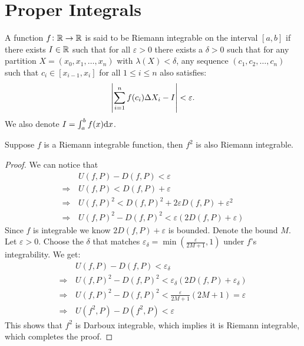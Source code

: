 \documentclass[11pt,a4paper]{article}
\begin{document}
  \maketitle

  \newpage
  \tableofcontents
	\newpage

  \section{Proper Integrals}
  \begin{definition}
    A function $f \colon \mathbb{R} \to \mathbb{R}$ is said to be Riemann integrable on the 
    interval $[a,b]$ if there exists $I \in \mathbb{R}$ such that for all 
    $\varepsilon > 0$ there exists a $\delta > 0$ such that 
    for any partition $X = (x_0,x_1,\dots,x_n)$ with $\lambda(X) < \delta$, 
    any sequence $(c_1,c_2,\ldots,c_n)$ such that $c_i \in[x_{i-1},x_i]$ for
    all $1 \le i \le n$ also satisfies:
    \[
      \left\lvert\sum_{i=1}^{n}{f(c_i)\Delta X_i} - I\right\rvert < \varepsilon.
	  \]
    We also denote $I = \int_{a}^{b} f(x)\dx$.
  \end{definition}
  \begin{proposition}
	  Suppose $f$ is a Riemann integrable function,
    then $f^2$ is also Riemann integrable.
  \end{proposition}
  \begin{proof}
    We can notice that
    \begin{align*}
      &U(f,P) - D(f,P) < \varepsilon \\
      \Rightarrow\, &U(f,P) < D(f,P) + \varepsilon \\
      \Rightarrow\, &U(f,P)^2<D(f,P)^2 + 2\varepsilon D(f,P) + \varepsilon^2 \\
      \Rightarrow\, &U(f,P)^2 - D(f,P)^2 < \varepsilon (2D(f,P) + \varepsilon)
    \end{align*}	
    Since $f$ is integrable we know $2D(f,P) + \varepsilon$ is bounded.
    Denote the bound $M$.
    Let $\varepsilon > 0$.
    Choose the $\delta$ that matches 
    $\varepsilon_{\delta} = \min(\frac{\varepsilon}{2M+1},1)$ 
    under $f$'s integrability.
    We get:
      \begin{align*}
        &U(f,P) - D(f,P) < \varepsilon_{\delta} \\
        \Rightarrow\, &U(f,P)^2 - D(f,P)^2 <
          \varepsilon_{\delta} (2D(f,P) + \varepsilon_{\delta}) \\
        \Rightarrow\, &U(f,P)^2 - D(f,P)^2 <
          \frac{\varepsilon}{2M+1} (2M + 1) = \varepsilon \\
        \Rightarrow\, &U(f^2,P) - D(f^2,P) < \varepsilon
      \end{align*}	
    This shows that $f^2$ is Darboux integrable, which implies
    it is Riemann integrable, which completes the proof.
  \end{proof}
\end{document}
